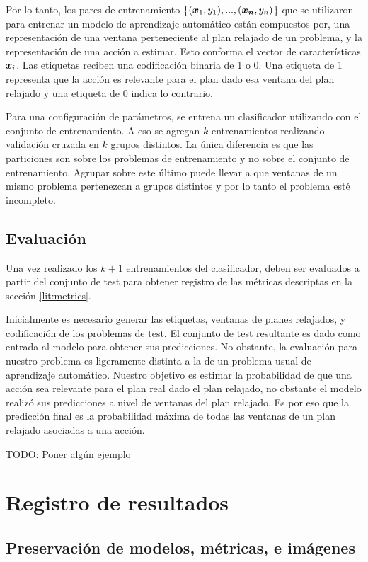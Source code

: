 Por lo tanto, los pares de entrenamiento \{$(\boldsymbol{x}_1, y_1), ..., (\boldsymbol{x_n}, y_n)$\} que se utilizaron para entrenar un modelo de aprendizaje automático están compuestos por, una representación de una ventana perteneciente al plan relajado de un problema, y la representación de una acción a estimar. Esto conforma el vector de características $\boldsymbol{x}_i$. Las etiquetas reciben una codificación binaria de 1 o 0. Una etiqueta de 1 representa que la acción es relevante para el plan dado esa ventana del plan relajado y una etiqueta de 0 indica lo contrario.

Para una configuración de parámetros, se entrena un clasificador utilizando con el conjunto de entrenamiento. A eso se agregan $k$ entrenamientos realizando validación cruzada en $k$ grupos distintos. La única diferencia es que las particiones son sobre los problemas de entrenamiento y no sobre el conjunto de entrenamiento. Agrupar sobre este último puede llevar a que ventanas de un mismo problema pertenezcan a grupos distintos y por lo tanto el problema esté incompleto.

\subsection{Evaluación}

Una vez realizado los $k + 1$ entrenamientos del clasificador, deben ser evaluados a partir del conjunto de test para obtener registro de las métricas descriptas en la sección \ref{lit:metrics}. 

Inicialmente es necesario generar las etiquetas, ventanas de planes relajados, y codificación de los problemas de test. El conjunto de test resultante es dado como entrada al modelo para obtener sus predicciones. No obstante, la evaluación para nuestro problema es ligeramente distinta a la de un problema usual de aprendizaje automático. Nuestro objetivo es estimar la probabilidad de que una acción sea relevante para el plan real dado el plan relajado, no obstante el modelo realizó sus predicciones a nivel de ventanas del plan relajado. Es por eso que la predicción final es la probabilidad máxima de todas las ventanas de un plan relajado asociadas a una acción.

TODO: Poner algún ejemplo

\section{Registro de resultados}

\subsection{Preservación de modelos, métricas, e imágenes}

